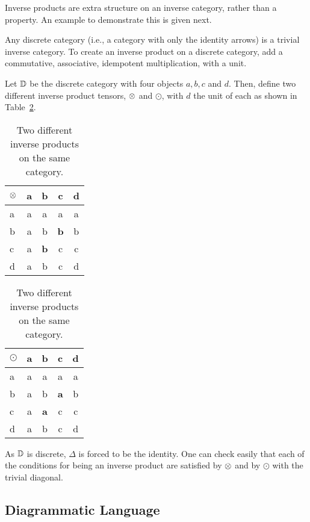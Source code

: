 Inverse products are extra structure on an inverse category, rather than a property. An example to
demonstrate this is given next.

\begin{example}
  \label{example:invprodisstructure}
\end{example}
Any discrete category (i.e., a category with only the identity arrows) is a trivial inverse
category. To create an inverse product on a discrete category, add a commutative, associative,
idempotent multiplication, with a unit.

Let $\mathbb{D}$ be the discrete category with four objects $a,b,c$ and $d$. Then, define
two different inverse product tensors, $\otimes$ and $\odot$, with $d$ the unit of each as shown in
Table~\ref{tab:two_different_inverse_products}.

\begin{table}[!htbp]
  \begin{center}
  \begin{tabular}{|l||c|c|c|c|}
    \hline
    $\otimes$&a&b&c&d\\ \hline \hline
    a&a&a&a&a\\ \hline
    b&a&b&\textbf{b}&b\\ \hline
    c&a&\textbf{b}&c&c \\ \hline
    d&a&b&c&d \\ \hline
  \end{tabular}
  \qquad
  \begin{tabular}{|l||c|c|c|c|} \hline
    $\odot$&a&b&c&d\\ \hline \hline
    a&a&a&a&a\\ \hline
    b&a&b&\textbf{a}&b\\ \hline
    c&a&\textbf{a}&c&c \\ \hline
    d&a&b&c&d \\ \hline
  \end{tabular}
  \end{center}
  \caption{Two different inverse products on the same category.}
  \label{tab:two_different_inverse_products}
\end{table}

As $\mathbb{D}$ is discrete, $\Delta$ is forced to be the identity. One can check easily that each of the
conditions for being an inverse product are satisfied by $\otimes$ and by $\odot$ with the trivial diagonal.

\subsection{Diagrammatic Language} %
\label{sub:diagrammatic_language}

